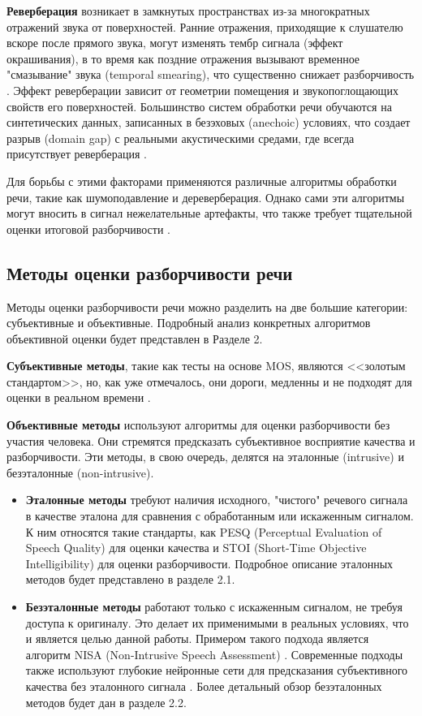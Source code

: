 \documentclass[oneside, final, 14pt]{extarticle}
\begin{document}
\textbf{Реверберация} возникает в замкнутых пространствах из-за многократных отражений звука от поверхностей. Ранние отражения, приходящие к слушателю вскоре после прямого звука, могут изменять тембр сигнала (эффект окрашивания), в то время как поздние отражения вызывают временное "смазывание" звука (temporal smearing), что существенно снижает разборчивость \cite{Falk2010}. Эффект реверберации зависит от геометрии помещения и звукопоглощающих свойств его поверхностей. Большинство систем обработки речи обучаются на синтетических данных, записанных в безэховых (anechoic) условиях, что создает разрыв (domain gap) с реальными акустическими средами, где всегда присутствует реверберация \cite{Wang2024}.

Для борьбы с этими факторами применяются различные алгоритмы обработки речи, такие как шумоподавление и дереверберация. Однако сами эти алгоритмы могут вносить в сигнал нежелательные артефакты, что также требует тщательной оценки итоговой разборчивости \cite{Falk2010, Vincent2006}.

\subsection{Методы оценки разборчивости речи}

Методы оценки разборчивости речи можно разделить на две большие категории: субъективные и объективные. Подробный анализ конкретных алгоритмов объективной оценки будет представлен в Разделе 2.

\textbf{Субъективные методы}, такие как тесты на основе MOS, являются <<золотым стандартом>>, но, как уже отмечалось, они дороги, медленны и не подходят для оценки в реальном времени \cite{Zha2003, Agrawal2025}.

\textbf{Объективные методы} используют алгоритмы для оценки разборчивости без участия человека. Они стремятся предсказать субъективное восприятие качества и разборчивости. Эти методы, в свою очередь, делятся на эталонные (intrusive) и безэталонные (non-intrusive).

\begin{itemize}
    \item \textbf{Эталонные методы} требуют наличия исходного, "чистого" речевого сигнала в качестве эталона для сравнения с обработанным или искаженным сигналом. К ним относятся такие стандарты, как PESQ (Perceptual Evaluation of Speech Quality) \cite{ITU-T2001} для оценки качества и STOI (Short-Time Objective Intelligibility) \cite{Taal2011} для оценки разборчивости. Подробное описание эталонных методов будет представлено в разделе 2.1.
    
    \item \textbf{Безэталонные методы} работают только с искаженным сигналом, не требуя доступа к оригиналу. Это делает их применимыми в реальных условиях, что и является целью данной работы. Примером такого подхода является алгоритм NISA (Non-Intrusive Speech Assessment) \cite{Sharma2016}. Современные подходы также используют глубокие нейронные сети для предсказания субъективного качества без эталонного сигнала \cite{Agrawal2025}. Более детальный обзор безэталонных методов будет дан в разделе 2.2.
\end{itemize}
\end{document}
